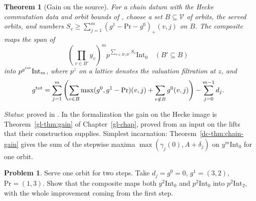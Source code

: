 \documentclass[reqno]{amsart}
\newcounter{chap}
\theoremstyle{definition}
\newtheorem{problem}{Problem}[section]
\theoremstyle{plain}
\newtheorem{theorem}{Theorem}[section]
\newcommand{\Int}{\mathrm{Int}}
\begin{document}
\begin{theorem}[Gain on the source]\label{thm:chain}
For a chain datum with the Hecke commutation data and orbit bounds of \cite[Thm.~10.7]{Adr}, choose a set \(B\subseteq\mathcal V\) of orbits, the \emph{served} orbits, and numbers \(S_v\ge\sum_{j=1}^m(g^1-\mathrm{Pr}-g^0)_+(v,j)\) on \(B\). The composite maps the span of
\[
 \left(\prod_{v\in B'}y_v\right)^m p^{\sum_{v\in B\setminus B'} S_v}\Int_0
 \quad(B'\subseteq B)
\]
into \(p^{g^{\rm tot}}\Int_m\), where \(p^z\) on a lattice denotes the valuation filtration at \(z\), and
\[
 g^{\rm tot}=\sum_{j=1}^m\left(\sum_{v\in B}\max(g^0,g^1-\mathrm{Pr})(v,j)
                  +\sum_{v\notin B}g^0(v,j)\right)-\sum_{j=0}^{m-1}d_j .
\]
\end{theorem}
\noindent \emph{Status}: proved in \cite{Adr}.  In the formalization the gain on the Hecke image is Theorem~\ref{gl-thm:gain} of Chapter~\ref{gl-chap}, proved from an input on the lifts that their construction supplies.  Simplest incarnation: Theorem~\ref{dc-thm:chain-gain} gives the sum of the stepwise maxima \(\max(\gamma_j(0),A+\delta_j)\) on \(y^m\Int_0\) for one orbit.

\begin{problem}\label{pr:price}
Serve one orbit for two steps. Take \(d_j=g^0=0\), \(g^1=(3,2)\), \(\mathrm{Pr}=(1,3)\). Show that the composite maps both \(y^2\Int_0\) and \(p^2\Int_0\) into \(p^2\Int_2\), with the whole improvement coming from the first step.
\end{problem}
\end{document}
